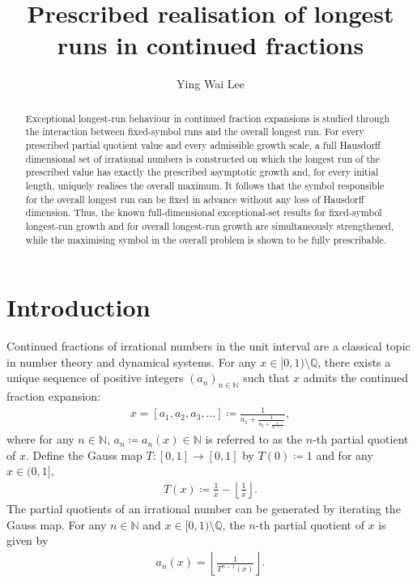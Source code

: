 \documentclass[12pt,reqno]{amsart}
\title{Prescribed realisation of longest runs in continued fractions}
\author{Ying Wai Lee}
\theoremstyle{definition}
\theoremstyle{plain}
\begin{document}
\begin{abstract}
    Exceptional longest-run behaviour in continued fraction expansions is studied through the interaction between fixed-symbol runs and the overall longest run. For every prescribed partial quotient value and every admissible growth scale, a full Hausdorff dimensional set of irrational numbers is constructed on which the longest run of the prescribed value has exactly the prescribed asymptotic growth and, for every initial length, uniquely realises the overall maximum. It follows that the symbol responsible for the overall longest run can be fixed in advance without any loss of Hausdorff dimension. Thus, the known full-dimensional exceptional-set results for fixed-symbol longest-run growth and for overall longest-run growth are simultaneously strengthened, while the maximising symbol in the overall problem is shown to be fully prescribable.
\end{abstract}
\maketitle

\section{Introduction}

Continued fractions of irrational numbers in the unit interval are a classical topic in number theory and dynamical systems. For any $x\in[0,1)\setminus\mathbb{Q}$, there exists a unique sequence of positive integers $(a_n)_{n\in\mathbb{N}}$ such that $x$ admits the continued fraction expansion:
\begin{align*}
    x=[a_1,a_2,a_3,\dots]
    \coloneqq\frac{1}{\displaystyle a_1+\frac{1}{\displaystyle a_2+\frac{1}{a_3+\cdots}}},
\end{align*}
where for any $n\in\mathbb{N}$, $a_n\coloneqq a_n(x)\in\mathbb{N}$ is referred to as the $n$-th partial quotient of $x$. Define the Gauss map $T:[0,1]\to[0,1]$ by $T(0)\coloneqq1$ and for any $x\in(0,1]$,
\begin{align*}
    T(x)\coloneqq\frac{1}{x}-\left\lfloor\frac{1}{x}\right\rfloor.
\end{align*}
The partial quotients of an irrational number can be generated by iterating the Gauss map. For any $n\in\mathbb{N}$ and $x\in[0,1)\setminus\mathbb{Q}$, the $n$-th partial quotient of $x$ is given by
\begin{align*}
    a_n(x)=\left\lfloor \frac{1}{T^{n-1}(x)}\right\rfloor.
\end{align*}
\end{document}
